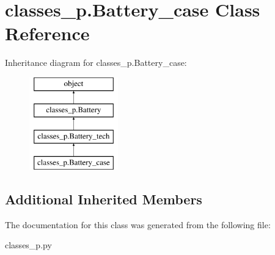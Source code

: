 \hypertarget{classclasses__p_1_1_battery__case}{}\section{classes\+\_\+p.\+Battery\+\_\+case Class Reference}
\label{classclasses__p_1_1_battery__case}
Inheritance diagram for classes\+\_\+p.\+Battery\+\_\+case\+:\begin{figure}[H]
\begin{center}
\leavevmode
\includegraphics[height=4.000000cm]{classclasses__p_1_1_battery__case}
\end{center}
\end{figure}
\subsection*{Additional Inherited Members}


The documentation for this class was generated from the following file\+:\begin{DoxyCompactItemize}
\item 
classes\+\_\+p.\+py\end{DoxyCompactItemize}
